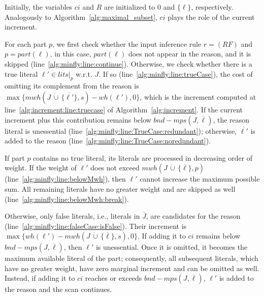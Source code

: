 \documentclass[preprint,authoryear]{elsarticle}
\newcommand{\lits}{\mathit{lits}}
\newcommand{\mwh}{\mathit{mwh}}
\newcommand{\wh}{\mathit{wh}}
\newcommand{\mps}{\mathit{mps}}
\newcommand{\bnd}{\mathit{bnd}}
\newcommand{\cupdot}{\,\dot{\cup}\,}
\theoremstyle{definition}
\begin{document}
{Initially, the variables $\mathit{ci}$ and $R$ are initialized to $0$ and $\{\ell\}$, respectively. Analogously to Algorithm~\ref{alg:maximal_subset}, $\mathit{ci}$ plays the role of the current increment.

For each part $p$, we first check whether the input inference rule $r = \mathit{(RF)}$ and $p = \mathit{part}(\ell)$, in this case, $\mathit{part}(\ell)$ does not appear in the reason, and it is skipped (line~\ref{alg:minfly:line:continue}). 
Otherwise, we check whether there is a true literal $\ell' \in \lits|_p$ w.r.t. $J$. If so (line~\ref{alg:minfly:line:trueCase}), the cost of omitting its complement from the reason is $\max\{\mwh(J \cupdot \{ \overline{\ell'} \}, s) - \wh(\ell'), 0\}$, which is the increment computed at line~\ref{alg:increment:line:truecase} of Algorithm~\ref{alg:increment}. If the current increment plus this contribution remains below $\bnd - \mps(J,\overline{\ell})$, the reason literal is unessential (line~\ref{alg:minfly:line:TrueCase:redundant}); otherwise, $\overline{\ell'}$ is added to the reason (line~\ref{alg:minfly:line:TrueCase:noredundant}).


If part $p$ contains no true literal, its literals are processed in decreasing order of weight. If the weight of $\ell'$ does not exceed $\mwh(J \cupdot \{\overline{\ell}\},p)$ (line~\ref{alg:minfly:line:belowMwh}), then $\ell'$ cannot increase the maximum possible sum. All remaining literals have no greater weight and are skipped as well (line~\ref{alg:minfly:line:belowMwh:break}).

Otherwise, only false literals, i.e., literals in $\overline{J}$, are candidates for the reason (line~\ref{alg:minfly:line:falseCase:isFalse}). Their increment is $\max\{\wh(\ell')-\mwh(J\cupdot\{\overline{\ell}\},s),0\}$. If adding it to $\mathit{ci}$ remains below $\bnd-\mps(J,\overline{\ell})$, then $\ell'$ is unessential. Once it is omitted, it becomes the maximum available literal of the part; consequently, all subsequent literals, which have no greater weight, have zero marginal increment and can be omitted as well. 
Instead, if adding it to $\mathit{ci}$ reaches or exceeds $\bnd-\mps(J,\overline{\ell})$, $\ell'$ is added to the reason and the scan continues.

}
\end{document}
